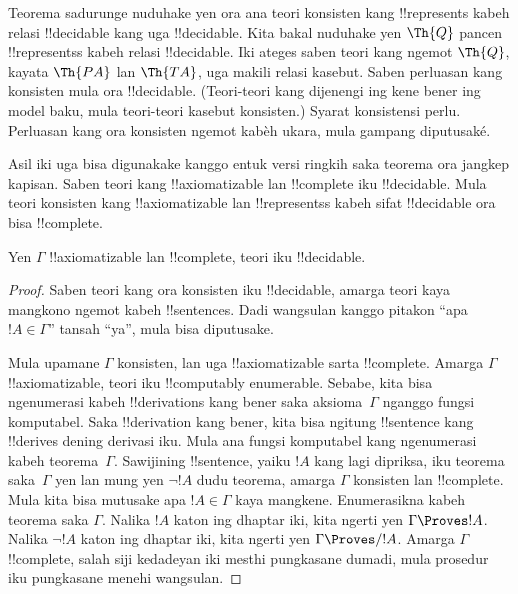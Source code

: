 \documentclass[../../../include/open-logic-section]{subfiles}
\begin{document}
\begin{explain}
Teorema sadurunge nuduhake yen ora ana teori
konsisten kang !!{represents} kabeh relasi
!!{decidable} kang uga !!{decidable}.
Kita bakal nuduhake yen $\Th{Q}$ pancen
!!{represents}s kabeh relasi !!{decidable}.
Iki ateges saben teori kang ngemot $\Th{Q}$,
kayata $\Th{PA}$ lan $\Th{TA}$, uga makili relasi kasebut.
Saben perluasan kang konsisten mula ora !!{decidable}.
(Teori-teori kang dijenengi ing kene bener ing model baku,
mula teori-teori kasebut konsisten.) Syarat konsistensi perlu. Perluasan kang ora konsisten ngemot kabèh ukara, mula gampang diputusaké.

Asil iki uga bisa digunakake kanggo entuk
versi ringkih saka teorema ora jangkep kapisan.
Saben teori kang !!{axiomatizable} lan
!!{complete} iku !!{decidable}. Mula teori
konsisten kang !!{axiomatizable} lan
!!{represents}s kabeh sifat !!{decidable}
ora bisa !!{complete}.
\end{explain}

\begin{thm}
Yen $\Gamma$ !!{axiomatizable} lan
!!{complete}, teori iku !!{decidable}.
\end{thm}

\begin{proof}
Saben teori kang ora konsisten iku !!{decidable},
amarga teori kaya mangkono ngemot kabeh
!!{sentence}s. Dadi wangsulan kanggo pitakon
``apa $!A \in \Gamma$'' tansah ``ya'',
mula bisa diputusake.

Mula upamane $\Gamma$ konsisten, lan uga
!!{axiomatizable} sarta !!{complete}.
Amarga $\Gamma$ !!{axiomatizable}, teori iku
!!{computably enumerable}. Sebabe, kita bisa
ngenumerasi kabeh !!{derivation}s kang bener
saka aksioma~$\Gamma$ nganggo fungsi komputabel.
Saka !!{derivation} kang bener, kita bisa ngitung
!!{sentence} kang !!{derive}s dening derivasi iku.
Mula ana fungsi komputabel kang ngenumerasi
kabeh teorema~$\Gamma$. Sawijining !!{sentence}, yaiku $!A$ kang lagi dipriksa,
iku teorema saka~$\Gamma$ yen lan mung yen
$\lnot !A$ dudu teorema, amarga $\Gamma$
konsisten lan !!{complete}. Mula kita bisa
mutusake apa $!A \in \Gamma$ kaya mangkene.
Enumerasikna kabeh teorema saka $\Gamma$.
Nalika $!A$ katon ing dhaptar iki, kita ngerti
yen $\Gamma \Proves !A$. Nalika
$\lnot !A$ katon ing dhaptar iki, kita ngerti
yen $\Gamma \Proves/ !A$. Amarga $\Gamma$
!!{complete}, salah siji kedadeyan iki mesthi
pungkasane dumadi, mula prosedur iku pungkasane
menehi wangsulan.
\end{proof}
\end{document}

